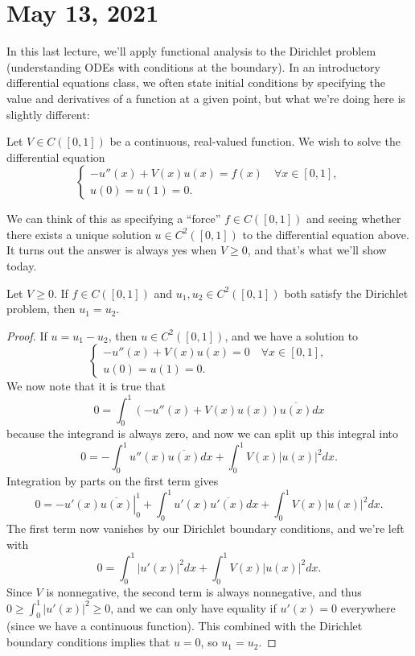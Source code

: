\pagebreak\section{May 13, 2021}

In this last lecture, we'll apply functional analysis to the Dirichlet problem (understanding ODEs with conditions at the boundary). In an introductory differential equations class, we often state initial conditions by specifying the value and derivatives of a function at a given point, but what we're doing here is slightly different:

\begin{problem}
Let $V \in C([0, 1])$ be a continuous, real-valued function. We wish to solve the differential equation 
\[
    \begin{cases} -u''(x) + V(x) u(x) = f(x) \quad \forall x \in [0, 1], \\ u(0) = u(1) = 0. \end{cases}
\]
\end{problem}

We can think of this as specifying a ``force'' $f \in C([0, 1])$ and seeing whether there exists a unique solution $u \in C^2([0, 1])$ to the differential equation above. It turns out the answer is always yes when $V \ge 0$, and that's what we'll show today. 

\begin{theorem}\label{dirichletuniqueness}
Let $V \ge 0$. If $f \in C([0, 1])$ and $u_1, u_2 \in C^2([0, 1])$ both satisfy the Dirichlet problem, then $u_1 = u_2$.
\end{theorem}
\begin{proof}
If $u = u_1 - u_2$, then $u \in C^2([0, 1])$, and we have a solution to
\[
    \begin{cases} -u''(x) + V(x) u(x) = 0 \quad \forall x \in [0, 1], \\ u(0) = u(1) = 0. \end{cases}
\]
We now note that it is true that
\[
    0 = \int_0^1 \left(-u''(x) + V(x) u(x)\right) \overline{u(x)} dx
\]
because the integrand is always zero, and now we can split up this integral into 
\[
    0 = -\int_0^1 u''(x) \overline{u(x)} dx + \int_0^1 V(x) |u(x)|^2 dx.
\]
Integration by parts on the first term gives 
\[
    0 = \left.-u'(x) \overline{u(x)}\right|^1_0 + \int_0^1 u'(x) \overline{u'(x)} dx + \int_0^1 V(x) |u(x)|^2 dx.
\]
The first term now vanishes by our Dirichlet boundary conditions, and we're left with 
\[
    0 = \int_0^1 |u'(x)|^2 dx + \int_0^1 V(x) |u(x)|^2 dx.
\]
Since $V$ is nonnegative, the second term is always nonnegative, and thus $0 \ge \int_0^1 |u'(x)|^2 \ge 0$, and we can only have equality if $u'(x) = 0$ everywhere (since we have a continuous function). This combined with the Dirichlet boundary conditions implies that $u = 0$, so $u_1 = u_2$.
\end{proof}

